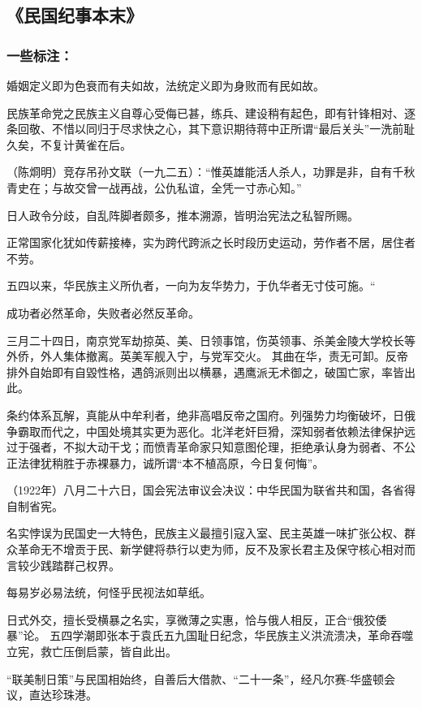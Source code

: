 \subsection{《民国纪事本末》}

\subsubsection{一些标注：}
婚姻定义即为色衰而有夫如故，法统定义即为身败而有民如故。

民族革命党之民族主义自尊心受侮已甚，练兵、建设稍有起色，即有针锋相对、逐条回敬、不惜以同归于尽求快之心，其下意识期待蒋中正所谓“最后关头”一洗前耻久矣，不复计黄雀在后。

（陈烱明）竞存吊孙文联（一九二五）：“惟英雄能活人杀人，功罪是非，自有千秋青史在；与故交曾一战再战，公仇私谊，全凭一寸赤心知。”

日人政令分歧，自乱阵脚者颇多，推本溯源，皆明治宪法之私智所赐。

正常国家化犹如传薪接棒，实为跨代跨派之长时段历史运动，劳作者不居，居住者不劳。

五四以来，华民族主义所仇者，一向为友华势力，于仇华者无寸伎可施。“

成功者必然革命，失败者必然反革命。

三月二十四日，南京党军劫掠英、美、日领事馆，伤英领事、杀美金陵大学校长等外侨，外人集体撤离。英美军舰入宁，与党军交火。 其曲在华，责无可卸。反帝排外自始即有自毀性格，遇鸽派则出以横暴，遇鹰派无术御之，破国亡家，率皆出此。

条约体系瓦解，真能从中牟利者，绝非高唱反帝之国府。列强势力均衡破坏，日俄争霸取而代之，中国处境其实更为恶化。北洋老奸巨猾，深知弱者依赖法律保护远过于强者，不拟大动干戈；而愤青革命家只知意图伦理，拒绝承认身为弱者、不公正法律犹稍胜于赤裸暴力，诚所谓“本不植高原，今日复何悔”。

（1922年）八月二十六日，国会宪法审议会决议：中华民国为联省共和国，各省得自制省宪。

名实悖误为民国史一大特色，民族主义最擅引寇入室、民主英雄一味扩张公权、群众革命无不增贡于民、新学健将恭行以吏为师，反不及家长君主及保守核心相对而言较少践踏群己权界。

每易岁必易法统，何怪乎民视法如草纸。

日式外交，擅长受横暴之名实，享微薄之实惠，恰与俄人相反，正合“俄狡倭暴”论。
五四学潮即张本于袁氏五九国耻日纪念，华民族主义洪流溃决，革命吞噬立宪，救亡压倒启蒙，皆自此出。

“联美制日策”与民国相始终，自善后大借款、“二十一条”，经凡尔赛-华盛顿会议，直达珍珠港。

